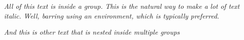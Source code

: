 \documentclass{article}
\begin{document}
{\it All of this text is inside a group. 
This is the natural way to make a lot of text italic.
Well, barring using an environment, which is typically preferred.}

{\it And this is { other text that is { nested inside multiple groups }}}
\end{document}
